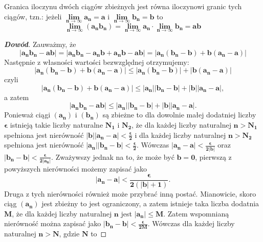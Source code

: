 \begin{theorem}
Granica iloczynu dwóch ciągów zbieżnych jest równa iloczynowi granic tych ciągów, 
tzn.: jeżeli
$\boldsymbol{\lim\limits_{n\to \infty }a_{n}=a}$  
i $\boldsymbol{\lim\limits_{n\to \infty }b_{n}=b}$ to 
\[
\boldsymbol{\lim\limits_{n\to \infty }\left (a_{n}b_{n}\right) = \lim\limits_{n\to \infty }a_{n}\cdot \lim\limits_{n\to \infty }b_{n}=ab}
\]
\end{theorem}
\begin{proof}[\textbf{Dowód}]
Zauważmy, że 
\[
\boldsymbol{\left |a_{n}b_{n}-ab\right|=\left |a_{n}b_{n}-a_{n}b + a_{n}b-ab\right|=\left |a_{n}\left (b_{n}-b\right)+b\left (a_{n}-a\right)\right|}
\] 
Następnie z własności wartości bezwzględnej otrzymujemy: 
\[
\boldsymbol{\left |a_{n}\left (b_{n}-b\right)+b\left (a_{n}-a\right )\right |\leqslant \left |a_{n}\left(b_{n}-b\right)\right|+\left |b\left( a_{n}-a\right)\right|}
\] 
czyli 
\[
\boldsymbol{\left |a_{n}\left(b_{n}-b\right)+b\left( a_{n}-a\right)\right|\leqslant \left |a_{n}\right|\left |b_{n}-b\right|+\left |b\right|\left |a_{n}-a\right|},
\] 
a zatem \[
\boldsymbol{\left |a_{n}b_{n}-ab\right|\leqslant \left |a_{n}\right|\left |b_{n}-b\right|+\left |b\right|\left |a_{n}-a\right|}.
\]
Ponieważ ciągi $\boldsymbol{\left (a_{n}\right)}$ i $\boldsymbol{\left (b_{n} \right)}$ 
są zbieżne to dla dowolnie małej dodatniej liczby $\boldsymbol{\epsilon}$ 
istnieją takie liczby naturalne $\boldsymbol{N_{1}}$ i $\boldsymbol{N_{2}}$, 
że dla każdej liczby naturalnej $\boldsymbol{n>N_{1}}$ spełniona jest nierówność 
$\boldsymbol{\left |b\right|\left |a_{n}-a\right|<\frac{\epsilon}{2}}$ 
i dla każdej liczby naturalnej $\boldsymbol{n>N_{2}}$ spełniona jest nierówność
 $\boldsymbol{\left |a_{n} \right|\left |b_{n}-b \right|<\frac{\epsilon}{2}}$.
Wówczas $\boldsymbol{\left |a_{n}-a\right|<\frac{\epsilon}{2\left |b\right|}}$ 
oraz $\boldsymbol{\left |b_{n}-b\right|<\frac{\epsilon}{2\left |a_{n}\right|}}$.
Zważywszy jednak na to, że może być $\boldsymbol{b=0}$, pierwszą z powyższych 
nierówności możemy zapisać jako \[
\boldsymbol{\left |a_{n}-a\right|<\frac{\epsilon}{2\left (\left |b\right|+1\right)}}.
\] 
Druga z tych nierówności również może przybrać inną postać. Mianowicie, skoro 
ciąg $\boldsymbol{\left (a_{n}\right)}$ jest zbieżny to jest ograniczony, 
a zatem istnieje taka liczba dodatnia $\boldsymbol{M}$, że dla każdej liczby 
naturalnej $\boldsymbol{n}$ jest $\boldsymbol{\left |a_{n}\right|\leqslant M}$. 
Zatem wspomnianą nierówność można zapisać jako $\boldsymbol{\left |b_{n}-b\right|<\frac{\epsilon}{2M}}$. 
Wówczas dla każdej liczby naturalnej $\boldsymbol{n>N}$, gdzie $\boldsymbol{N}$ to 

\end{proof}
